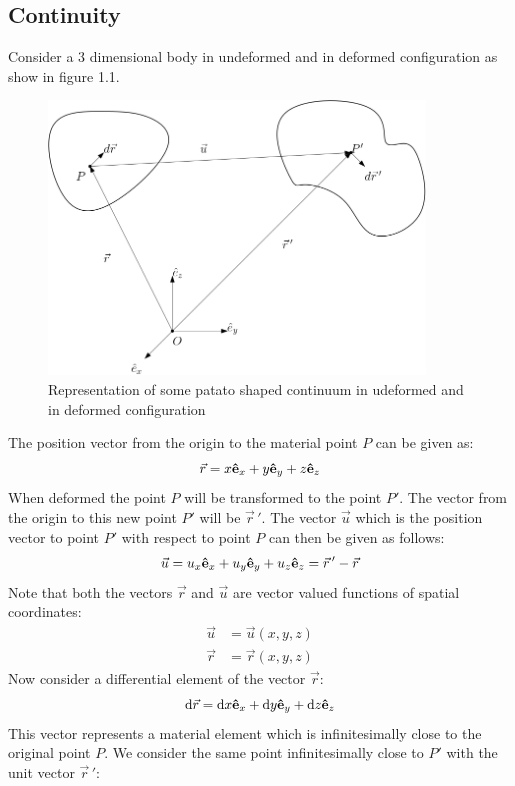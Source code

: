 \documentclass[11pt, a4paper]{article}
\renewcommand*{\d}{\text{d}}
\DeclareRobustCommand{\uvec}[1]{{%
  \ifcat\relax\noexpand#1%
    \bm{\hat{#1}}%
  \else
    \ifcsname uvec#1\endcsname
      \csname uvec#1\endcsname
    \else
      \bm{\hat{\mathbf{#1}}}%
     \fi
   \fi
}}
\numberwithin{equation}{section}
\begin{document}
\subsection{Continuity}
Consider a 3 dimensional body in undeformed and in deformed configuration as show in figure 1.1.
\begin{figure}[h]
  \centerline{\includegraphics[width=100mm]{images/Deformation_example.png}}
  \caption{Representation of some patato shaped continuum in udeformed and in deformed configuration}
\end{figure}
The position vector from the origin to the material point $P$ can be given as:
\begin{equation}
  \vec{r} = x\uvec{e}_x + y\uvec{e}_y + z\uvec{e}_z
\end{equation}
When deformed the point $P$ will be transformed to the point $P'$. The vector from the origin to this new point $P'$ will be $\vec{r}\,'$. The vector $\vec{u}$ which is the position vector to point $P'$ with respect to point $P$ can then be given as follows:
\begin{equation}
  \vec{u} =  u_x\uvec{e}_x + u_y\uvec{e}_y + u_z\uvec{e}_z = \vec{r}\,' - \vec{r}
\end{equation}
Note that both the vectors $\vec{r}$ and $\vec{u}$ are vector valued functions of spatial coordinates:
\begin{align}
  \vec{u} &= \vec{u}(x, y, z)\\
  \vec{r} &= \vec{r}(x, y, z)
\end{align}
Now consider a differential element of the vector $\vec{r}$:
\begin{equation}
  \d\vec{r} = \d x\uvec{e}_x + \d y\uvec{e}_y + \d z\uvec{e}_z
\end{equation}
This vector represents a material element which is infinitesimally  close to the original point $P$. We consider the same point infinitesimally close to $P'$ with the unit vector $\vec{r}\,'$:
\end{document}
